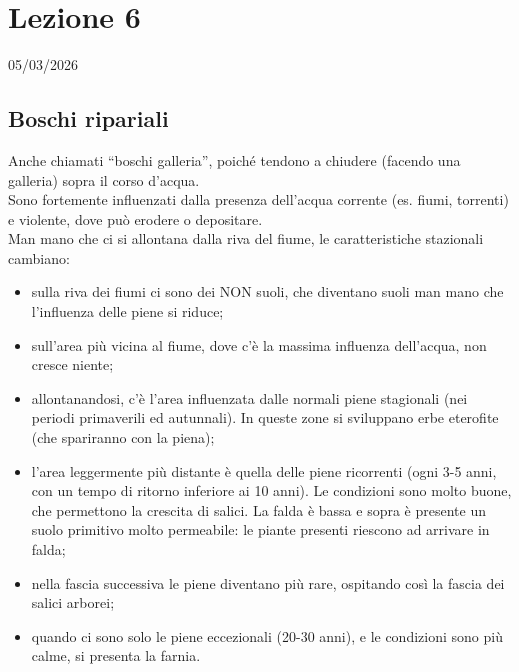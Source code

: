 \section{Lezione 6} \hfill 05/03/2026
\subsection{Boschi ripariali}
Anche chiamati ``boschi galleria'', poiché tendono a chiudere (facendo una galleria) sopra il corso d'acqua.\\
Sono fortemente influenzati dalla presenza dell'acqua corrente (es. fiumi, torrenti) e violente, dove può erodere o depositare.\\
Man mano che ci si allontana dalla riva del fiume, le caratteristiche stazionali cambiano:
\begin{itemize}[nosep]
    \item sulla riva dei fiumi ci sono dei NON suoli, che diventano suoli man mano che l'influenza delle piene si riduce;
    \item sull'area più vicina al fiume, dove c'è la massima influenza dell'acqua, non cresce niente;
    \item allontanandosi, c'è l'area influenzata dalle normali piene stagionali (nei periodi primaverili ed autunnali). In queste zone si sviluppano erbe eterofite (che spariranno con la piena);
    \item l'area leggermente più distante è quella delle piene ricorrenti (ogni 3-5 anni, con un tempo di ritorno inferiore ai 10 anni). Le condizioni sono molto buone, che permettono la crescita di salici. La falda è bassa e sopra è presente un suolo primitivo molto permeabile: le piante presenti riescono ad arrivare in falda;
    \item nella fascia successiva le piene diventano più rare, ospitando così la fascia dei salici arborei;
    \item quando ci sono solo le piene eccezionali (20-30 anni), e le condizioni sono più calme, si presenta la farnia.
\end{itemize}
